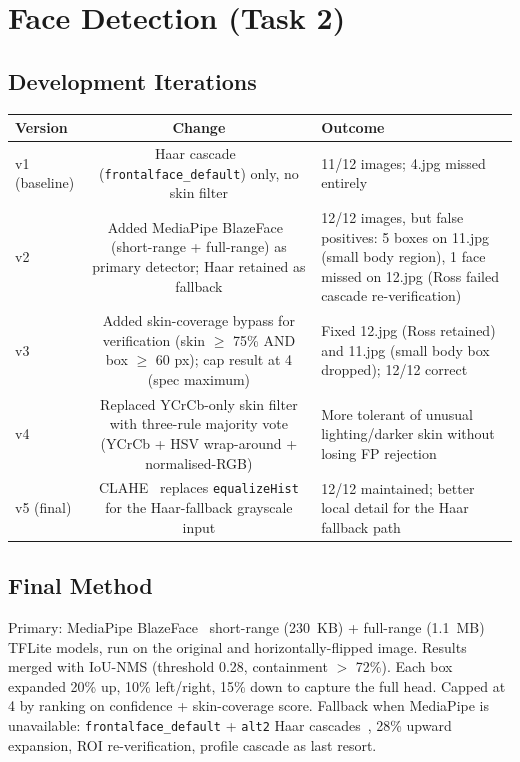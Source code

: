 \section{Face Detection (Task 2)}

\subsection{Development Iterations}
\noindent
\begin{tabularx}{\linewidth}{@{}V C O@{}}
\toprule
\textbf{Version} & \textbf{Change} & \textbf{Outcome} \\
\midrule
v1 (baseline) & Haar cascade~\citep{viola2001rapid} (\texttt{frontalface\_default}) only,
                no skin filter
              & 11/12 images; 4.jpg missed entirely \\
v2 & Added MediaPipe BlazeFace~\citep{bazarevsky2019blazeface} (short-range +
     full-range) as primary detector; Haar retained as fallback
   & 12/12 images, but false positives: 5 boxes on 11.jpg (small body region),
     1 face missed on 12.jpg (Ross failed cascade re-verification) \\
v3 & Added skin-coverage bypass for verification (skin $\geq$ 75\% AND box $\geq$ 60 px);
     cap result at 4 (spec maximum)
   & Fixed 12.jpg (Ross retained) and 11.jpg (small body box dropped); 12/12 correct \\
v4 & Replaced YCrCb-only skin filter with three-rule majority vote
     (YCrCb + HSV wrap-around + normalised-RGB)
   & More tolerant of unusual lighting/darker skin without losing FP rejection \\
v5 (final) & CLAHE~\citep{zuiderveld1994clahe} replaces \texttt{equalizeHist}
             for the Haar-fallback grayscale input
           & 12/12 maintained; better local detail for the Haar fallback path \\
\bottomrule
\end{tabularx}

\subsection{Final Method}
Primary: MediaPipe BlazeFace~\citep{bazarevsky2019blazeface} short-range (230~KB)
+ full-range (1.1~MB) TFLite models, run on the original and horizontally-flipped
image. Results merged with IoU-NMS (threshold 0.28, containment $>$ 72\%). Each
box expanded 20\% up, 10\% left/right, 15\% down to capture the full head. Capped
at 4 by ranking on confidence + skin-coverage score. Fallback when MediaPipe is
unavailable: \texttt{frontalface\_default} + \texttt{alt2} Haar
cascades~\citep{viola2001rapid}, 28\% upward expansion, ROI re-verification,
profile cascade as last resort.

